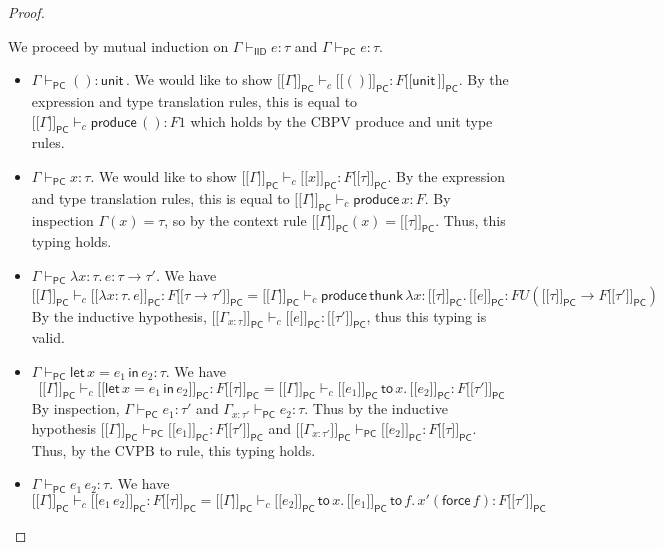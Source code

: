 \documentclass{article}
\newcommand{\iid}{\mathsf{IID}}
\newcommand{\pc}{\mathsf{PC}}
\newcommand{\unit}{\mathsf{unit\,}}
\newcommand{\letc}{\mathsf{let \,}}
\newcommand{\inc}{\mathsf{\, in \,}}
\newcommand{\toc}{\mathsf{\, to \,}}
\newcommand{\1}{\mathsf{\,\#1\,}}
\newcommand{\2}{\mathsf{\,\#2\,}}
\newcommand{\force}{\mathsf{force \,}}
\newcommand{\thunk}{\mathsf{thunk \,}}
\newcommand{\produce}{\mathsf{produce \,}}
\newcommand{\sempc}[1]{[\![ #1 {]\!]}_{\mathsf{PC}}}
\begin{document}
\begin{proof}$\,$

We proceed by mutual induction on
$\Gamma \vdash_{\iid} e : \tau$ and $\Gamma \vdash_{\pc} e : \tau$.
\begin{itemize}
	\item
	$\Gamma \vdash_\pc () : \unit$.
	We would like to show $\sempc{\Gamma} \vdash_c \sempc{()} : F \sempc{\unit}$.
	By the expression and type translation rules, this is equal to 
	$\sempc{\Gamma} \vdash_c \produce () : F 1$
	which holds by the CBPV produce and unit type rules.
	\item
	$\Gamma \vdash_\pc x : \tau$.
	We would like to show $\sempc{\Gamma} \vdash_c \sempc{x} : F \sempc{\tau}$.
	By the expression and type translation rules, this is equal to 
	$\sempc{\Gamma} \vdash_c \produce x : F $.
	By inspection $\Gamma(x) = \tau$, so by the context rule
	$\sempc{\Gamma}(x) = \sempc{\tau}$.
	Thus, this typing holds.
	\item
	$\Gamma \vdash_\pc \lambda x: \tau.\, e : \tau \to \tau'$.
	We have
	\begin{equation*}
		\sempc{\Gamma} \vdash_c \sempc{\lambda x : \tau.\, e} : F \sempc{\tau \to \tau'}
		=
		\sempc{\Gamma} 
		\vdash_c \produce \thunk \lambda x : \sempc{\tau}.\, \sempc{e} : 
		F U (\sempc{\tau} \to F \sempc{\tau'})
	\end{equation*}
	By the inductive hypothesis, 
	$\sempc{\Gamma_{x : \tau}} \vdash_c \sempc{e} : \sempc{\tau'}$,
	thus this typing is valid.
	\item
	$\Gamma \vdash_\pc \letc x = e_1 \inc e_2 : \tau$.
	We have
	\begin{equation*}
		\sempc{\Gamma} \vdash_c \sempc{\letc x = e_1 \inc e_2} : F \sempc{\tau}
		=
		\sempc{\Gamma} 
		\vdash_c \sempc{e_1} \toc x.\, \sempc{e_2}  :  F \sempc{\tau'}
	\end{equation*}
	By inspection, $\Gamma \vdash_\pc e_1 : \tau'$
	and 
	$\Gamma_{x : \tau'} \vdash_\pc e_2 : \tau$.
	Thus by the inductive hypothesis 
	$\sempc{\Gamma} \vdash_\pc \sempc{e_1} : F \sempc{\tau'}$
	and 
	$\sempc{\Gamma_{x : \tau'}} \vdash_\pc \sempc{e_2} : F \sempc{\tau}$.
	Thus, by the CVPB to rule, this typing holds.
	\item
	$\Gamma \vdash_\pc  e_1\, e_2 : \tau$.
	We have
	\begin{equation*}
		\sempc{\Gamma} \vdash_c \sempc{e_1\, e_2} : F \sempc{\tau}
		=
		\sempc{\Gamma} 
		\vdash_c \sempc{e_2} \toc x.\, \sempc{e_1} \toc f.\, x'(\force f)  :  F \sempc{\tau'}

\end{equation*}
\end{itemize}
\end{proof}
\end{document}
